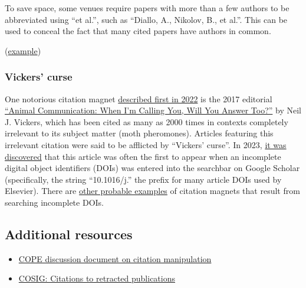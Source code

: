 \documentclass[letterpaper, 12pt]{article}
\begin{document}
To save space, some venues require papers with more than a few authors to be abbreviated using ``et al.'',
such as ``Diallo, A., Nikolov, B., et al.''.
This can be used to conceal the fact that many cited papers have authors in common.

(\href{https://pubpeer.com/publications/00DCF18F504B8C420F12A70B5FB30C}{example})

\subsubsection*{Vickers' curse}

One notorious citation magnet \href{https://forbetterscience.com/2022/10/31/when-im-citing-you-will-you-answer-too/}{described first in 2022} is the 2017 editorial \href{https://doi.org/10.1016/j.cub.2017.05.064}{``Animal Communication: When I’m Calling You, Will You Answer Too?''} by Neil J. Vickers, which has been cited as many as 2000 times in contexts completely irrelevant to its subject matter (moth pheromones). Articles featuring this irrelevant citation were said to be afflicted by ``Vickers' curse''. In 2023, \href{https://forbetterscience.com/2023/07/31/the-vickers-curse-secret-revealed/}{it was discovered} that this article was often the first to appear when an incomplete digital object identifiers (DOIs) was entered into the searchbar on Google Scholar (specifically, the string ``10.1016/j.'' the prefix for many article DOIs used by Elsevier). There are \href{https://pubpeer.com/publications/4BB5BE5F56EFEBC3A67D89D1EB5501}{other probable examples} of citation magnets that result from searching incomplete DOIs. 

\subsection*{Additional resources}

\begin{itemize}
    \setlength\itemsep{-0.5em}
    \item \href{https://doi.org/10.24318/cope.2019.3.1}{COPE discussion document on citation manipulation}
    \item \href{https://osf.io/9q3as}{COSIG: Citations to retracted publications}
\end{itemize}
\end{document}
